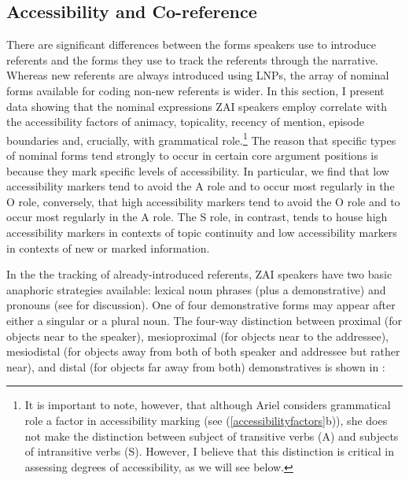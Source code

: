 \subsection{Accessibility and Co-reference}

There are significant differences between the forms speakers use to introduce referents and the forms they use to track the referents through the narrative. Whereas new referents are always introduced using LNPs, the array of nominal forms available for coding non-new referents is wider. In this section, I present data showing that the nominal expressions ZAI speakers employ correlate with the accessibility factors of animacy, topicality, recency of mention, episode boundaries and, crucially, with grammatical role.\footnote{It is important to note, however, that although Ariel considers grammatical role a factor in accessibility marking (see (\ref{accessibilityfactors}b)), she does not make the distinction between subject of transitive verbs (A) and subjects of intransitive verbs (S). However, I believe that this distinction is critical in assessing degrees of accessibility, as we will see below.} The reason that specific types of nominal forms tend strongly to occur in certain core argument positions is because they mark specific levels of accessibility. In particular, we find that low accessibility markers tend to avoid the A role and to occur most regularly in the O role, conversely, that high accessibility markers tend to avoid the O role and to occur most regularly in the A role. The S role, in contrast, tends to house high accessibility markers in contexts of topic continuity and low accessibility markers in contexts of new or marked information.


In the the tracking of already-introduced referents, ZAI speakers have two basic anaphoric strategies available: lexical noun phrases (plus a demonstrative) and pronouns (see  for discussion). One of four demonstrative forms may appear after either a singular or a plural noun. The four-way distinction between proximal (for objects near to the speaker), mesioproximal (for objects near to the addressee), mesiodistal (for objects away from both of both speaker and addressee but rather near), and distal (for objects far away from both) demonstratives is shown in : 
 
